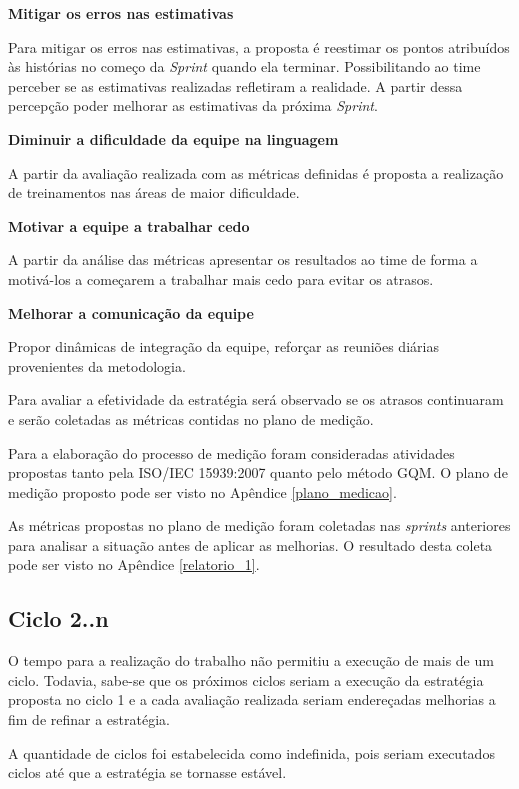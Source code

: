 			\textbf{Mitigar os erros nas estimativas}

				Para mitigar os erros nas estimativas, a proposta é reestimar os pontos atribuídos às histórias no começo da \textit{Sprint} quando ela terminar. Possibilitando ao time perceber se as estimativas realizadas refletiram a realidade. A partir dessa percepção poder melhorar as estimativas da próxima \textit{Sprint}.

			\textbf{Diminuir a dificuldade da equipe na linguagem}

				A partir da avaliação realizada com as métricas definidas é proposta a realização de treinamentos nas áreas de maior dificuldade.

			\textbf{Motivar a equipe a trabalhar cedo}

				A partir da análise das métricas apresentar os resultados ao time de forma a motivá-los a começarem a trabalhar mais cedo para evitar os atrasos.

			\textbf{Melhorar a comunicação da equipe}

				Propor dinâmicas de integração da equipe, reforçar as reuniões diárias provenientes da metodologia.



				Para avaliar a efetividade da estratégia será observado se os atrasos continuaram e serão coletadas as métricas contidas no plano
				de medição.


		
		 Para a elaboração do processo de medição foram consideradas atividades propostas tanto pela ISO/IEC 15939:2007 
		 quanto pelo método GQM. O plano de medição proposto pode ser visto no Apêndice \ref{plano_medicao}.

		
		As métricas propostas no plano de medição foram coletadas nas \textit{sprints} anteriores para analisar a situação antes de aplicar as melhorias. O resultado desta coleta pode ser visto no Apêndice \ref{relatorio_1}.



\subsection{Ciclo 2..n}

	O tempo para a realização do trabalho não permitiu a execução de mais de um ciclo. Todavia,
	sabe-se que os próximos ciclos seriam a execução da estratégia proposta no ciclo 1 e a cada avaliação realizada
	seriam endereçadas melhorias a fim de refinar a estratégia.

	A quantidade de ciclos foi estabelecida como indefinida, pois seriam executados ciclos até que a estratégia 
	se tornasse estável.

